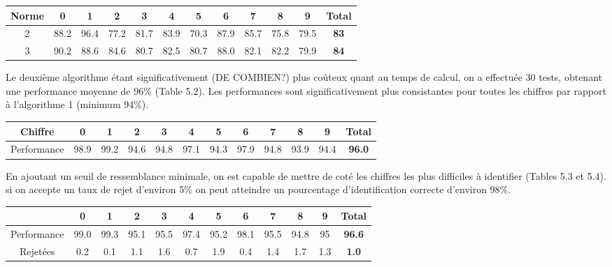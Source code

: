 \documentclass[a4paper,11pt,twoside]{report}
\begin{document}
\begin{center}
\begin{tabular}{ |c||c|c|c|c|c|c|c|c|c|c|c| } 
\hline
 Norme & 0 & 1 & 2 & 3 & 4 & 5 & 6 & 7 & 8 & 9 & \textbf{Total} \\ 
  \hline
  \hline
  2 & 88.2 & 96.4 & 77.2 & 81.7 & 83.9 & 70.3 & 87.9 & 85.7 & 75.8 & 79.5 & \textbf{83} \\
 \hline
  3 & 90.2 & 88.6 & 84.6 & 80.7 & 82.5 & 80.7 & 88.0 & 82.1 & 82.2 & 79.9 & \textbf{84} \\
 \hline
\end{tabular}
\end{center}

Le deuxième algorithme étant significativement (DE COMBIEN?) plus coûteux quant au temps de calcul, on a effectuée 30 tests, obtenant une performance moyenne de 96\% (Table 5.2). Les performances sont significativement plus consistantes pour toutes les chiffres par rapport à l'algorithme 1 (minimum 94\%).

\begin{center}
\begin{tabular}{ |c||c|c|c|c|c|c|c|c|c|c|c| } 
\hline
 Chiffre & 0 & 1 & 2 & 3 & 4 & 5 & 6 & 7 & 8 & 9 & \textbf{Total} \\ 
  \hline
  \hline
  Performance & 98.9 & 99.2 & 94.6 & 94.8 & 97.1 & 94.3 & 97.9 & 94.8 & 93.9 & 94.4 & \textbf{96.0} \\ 
\hline
\end{tabular}
\end{center}

En ajoutant un seuil de ressemblance minimale, on est capable de mettre de coté les chiffres les plus difficiles à identifier (Tables 5.3 et 5.4). si on accepte un taux de rejet d'environ 5\% on peut atteindre un pourcentage d'identification correcte d'environ 98\%.

\begin{center}
\begin{tabular}{ |c||c|c|c|c|c|c|c|c|c|c|c| } 
 \hline
   & 0 & 1 & 2 & 3 & 4 & 5 & 6 & 7 & 8 & 9 & \textbf{Total} \\ 
  \hline
  \hline
 Performance & 99.0 & 99.3 & 95.1 & 95.5 & 97.4 & 95.2 & 98.1 & 95.5 & 94.8 & 95 &  \textbf{96.6} \\
  \hline
 Rejetées & 0.2 & 0.1 & 1.1 & 1.6 & 0.7 & 1.9 & 0.4 & 1.4 & 1.7 & 1.3 & \textbf{1.0} \\
 \hline
\end{tabular}
\end{center}
\end{document}
